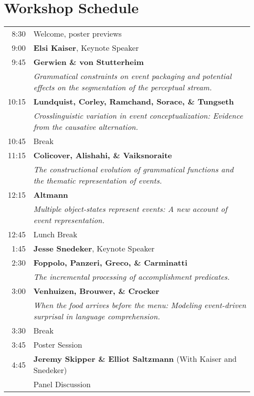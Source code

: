 \documentclass[12pt]{article}
\begin{document}
\section*{Workshop Schedule}
\begin{table}[h]
\begin{tabularx}{\textwidth}{r X}
    8:30 & Welcome, poster previews \\
    9:00 & \textbf{Elsi Kaiser}, Keynote Speaker \\
    9:45 & \textbf{Gerwien \& von Stutterheim} \\
         & \textit{Grammatical constraints on event packaging and potential effects on the segmentation of the perceptual stream.} \\
   10:15 & \textbf{Lundquist, Corley, Ramchand, Sorace, \& Tungseth} \\
         & \textit{Crosslinguistic variation in event conceptualization: Evidence from the causative alternation.}\\
   10:45 & Break \\
   11:15 & \textbf{Colicover, Alishahi, \& Vaiksnoraite} \\
         & \textit{The constructional evolution of grammatical functions and the thematic representation of events.}\\
   12:15 & \textbf{Altmann} \\
         & \textit{Multiple object-states represent events: A new account of event representation.} \\
   12:45 & Lunch Break \\
    1:45 & \textbf{Jesse Snedeker}, Keynote Speaker\\
    2:30 & \textbf{Foppolo, Panzeri, Greco, \& Carminatti} \\
         & \textit{The incremental processing of accomplishment predicates.} \\
    3:00 & \textbf{Venhuizen, Brouwer, \& Crocker} \\
         & \textit{When the food arrives before the menu: Modeling event-driven surprisal in language comprehension.} \\
    3:30 & Break \\
    3:45 & Poster Session \\
    4:45 & \textbf{Jeremy Skipper \& Elliot Saltzmann} (With Kaiser and Snedeker) \\
         & Panel Discussion \\
\end{tabularx}
\end{table}
\end{document}
